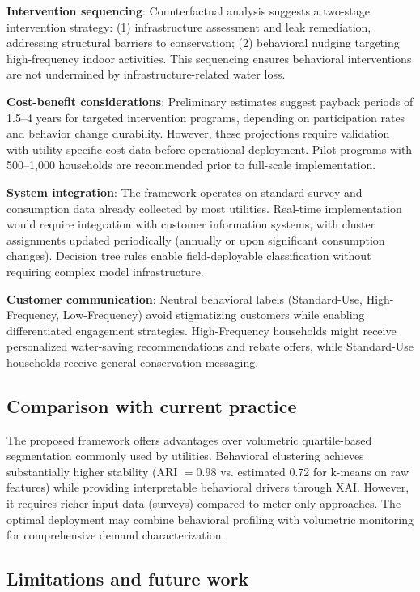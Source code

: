 \documentclass[a4paper,12pt]{article}
\begin{document}
\textbf{Intervention sequencing}: Counterfactual analysis suggests a two-stage intervention strategy: (1) infrastructure assessment and leak remediation, addressing structural barriers to conservation; (2) behavioral nudging targeting high-frequency indoor activities. This sequencing ensures behavioral interventions are not undermined by infrastructure-related water loss.

\textbf{Cost-benefit considerations}: Preliminary estimates suggest payback periods of 1.5--4 years for targeted intervention programs, depending on participation rates and behavior change durability. However, these projections require validation with utility-specific cost data before operational deployment. Pilot programs with 500--1,000 households are recommended prior to full-scale implementation.

\textbf{System integration}: The framework operates on standard survey and consumption data already collected by most utilities. Real-time implementation would require integration with customer information systems, with cluster assignments updated periodically (annually or upon significant consumption changes). Decision tree rules enable field-deployable classification without requiring complex model infrastructure.

\textbf{Customer communication}: Neutral behavioral labels (Standard-Use, High-Frequency, Low-Frequency) avoid stigmatizing customers while enabling differentiated engagement strategies. High-Frequency households might receive personalized water-saving recommendations and rebate offers, while Standard-Use households receive general conservation messaging.

\subsection{Comparison with current practice}

The proposed framework offers advantages over volumetric quartile-based segmentation commonly used by utilities. Behavioral clustering achieves substantially higher stability (ARI $= 0.98$ vs. estimated 0.72 for k-means on raw features) while providing interpretable behavioral drivers through XAI. However, it requires richer input data (surveys) compared to meter-only approaches. The optimal deployment may combine behavioral profiling with volumetric monitoring for comprehensive demand characterization.

\subsection{Limitations and future work}
\end{document}
